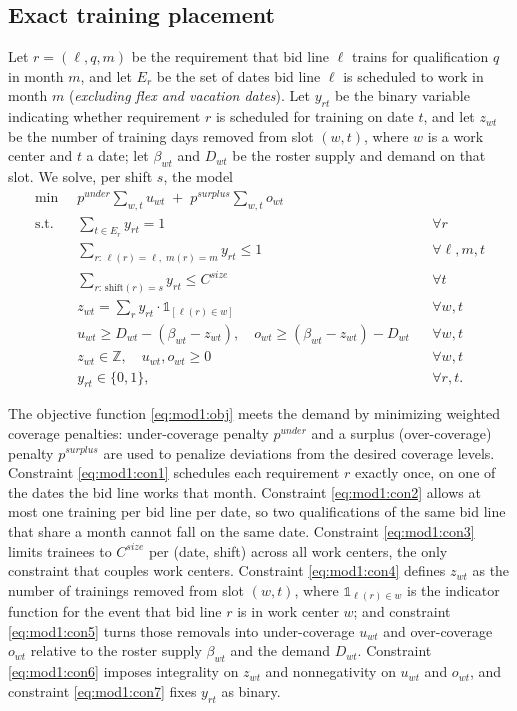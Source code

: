 \documentclass[preprint,12pt]{elsarticle}
\begin{document}
   \subsection{Exact training placement}\label{subsec:exact_training}
   Let $r=(\ell,q,m)$ be the requirement that bid line $\ell$ trains for qualification $q$ in month $m$, and let $E_r$ be the set of dates bid line $\ell$ is scheduled to work in month $m$ (\emph{excluding flex and vacation dates}). Let $y_{rt}$ be the binary variable indicating whether requirement $r$ is scheduled for training on date $t$, and let $z_{wt}$ be the number of training days removed from slot $(w,t)$, where $w$ is a work center and $t$ a date; let $\beta_{wt}$ and $D_{wt}$ be the roster supply and demand on that slot. We solve, per shift $s$, the model
   \begin{align}
      \min \;\; & p^{under}\sum\limits_{w,t} u_{wt} \;+\; p^{surplus}\sum\limits_{w,t} o_{wt} \label{eq:mod1:obj}\\
      \text{s.t.}\;\; & \sum\limits_{t\in E_r} y_{rt} = 1 && \forall r \label{eq:mod1:con1}\\
      & \sum\limits_{r:\,\ell(r)=\ell,\;m(r)=m} y_{rt} \le 1 && \forall \ell,m,t \label{eq:mod1:con2}\\
      & \sum\limits_{r:\,\text{shift}(r)=s} y_{rt} \le C^{size} && \forall t \label{eq:mod1:con3}\\
      & z_{wt} = \sum\limits_{r} y_{rt} \cdot \mathds{1}_{[\ell(r)\in w]} && \forall w,t \label{eq:mod1:con4}\\
      & u_{wt} \ge D_{wt} - (\beta_{wt}-z_{wt}),\quad o_{wt} \ge (\beta_{wt}-z_{wt}) - D_{wt} && \forall w,t \label{eq:mod1:con5}\\
      & z_{wt}\in\mathbb{Z},\quad u_{wt},o_{wt}\ge 0  && \forall w,t \label{eq:mod1:con6} \\
      & y_{rt}\in\{0,1\},  && \forall r,t. \label{eq:mod1:con7}
   \end{align}
   
   The objective function \eqref{eq:mod1:obj} meets the demand by minimizing weighted coverage penalties: under-coverage penalty $p^{under}$ and a surplus (over-coverage) penalty $p^{surplus}$ are used to penalize deviations from the desired coverage levels. 
   Constraint \eqref{eq:mod1:con1} schedules each requirement $r$ exactly once, on one of the dates the bid line works that month. 
   Constraint \eqref{eq:mod1:con2} allows at most one training per bid line per date, so two qualifications of the same bid line that share a month cannot fall on the same date. 
   Constraint \eqref{eq:mod1:con3} limits trainees to $C^{size}$ per (date, shift) across all work centers, the only constraint that couples work centers. 
   Constraint \eqref{eq:mod1:con4} defines $z_{wt}$ as the number of trainings removed from slot $(w,t)$, where $\mathds{1}_{\ell(r)\in w}$ is the indicator function for the event that bid line $r$ is in work center $w$; and constraint \eqref{eq:mod1:con5} turns those removals into under-coverage $u_{wt}$ and over-coverage $o_{wt}$ relative to the roster supply $\beta_{wt}$ and the demand $D_{wt}$. 
   Constraint \eqref{eq:mod1:con6} imposes integrality on $z_{wt}$ and nonnegativity on $u_{wt}$ and $o_{wt}$, and constraint \eqref{eq:mod1:con7} fixes $y_{rt}$ as binary.
\end{document}
